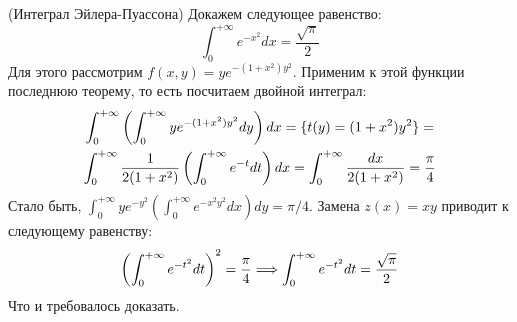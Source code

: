 \begin{example} (Интеграл Эйлера-Пуассона)
	Докажем следующее равенство:
	\[
		\int_0^{+\infty} e^{-x^2}dx = \frac{\sqrt{\pi}}{2}
	\]
	Для этого рассмотрим $f(x, y) = ye^{-(1 + x^2)y^2}$. Применим к этой функции последнюю теорему, то есть посчитаем двойной интеграл:
	\begin{multline*}
		\int_0^{+\infty} \left(\int_0^{+\infty} ye^{-(1 + x^2)y^2}dy\right)dx = \{t(y) = (1 + x^2)y^2\} =
		\\
		\int_0^{+\infty} \frac{1}{2(1 + x^2)} \left(\int_0^{+\infty} e^{-t}dt\right)dx = \int_0^{+\infty} \frac{dx}{2(1 + x^2)} = \frac{\pi}{4}
	\end{multline*}
	Стало быть, $\int_0^{+\infty} ye^{-y^2}(\int_0^{+\infty} e^{-x^2y^2}dx)dy = \pi / 4$. Замена $z(x) = xy$ приводит к следующему равенству:
	\[
		\left(\int_0^{+\infty} e^{-t^2}dt\right)^2 = \frac{\pi}{4} \Longrightarrow \int_0^{+\infty} e^{-t^2}dt = \frac{\sqrt{\pi}}{2}
	\]
	Что и требовалось доказать.
\end{example}
